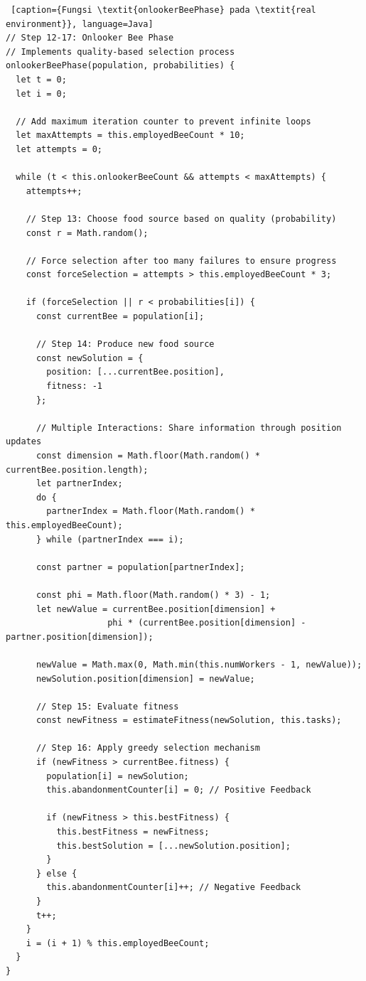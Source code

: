\begin{lstlisting} [caption={Fungsi \textit{onlookerBeePhase} pada \textit{real environment}}, language=Java]
// Step 12-17: Onlooker Bee Phase
// Implements quality-based selection process
onlookerBeePhase(population, probabilities) {
  let t = 0;
  let i = 0;
  
  // Add maximum iteration counter to prevent infinite loops
  let maxAttempts = this.employedBeeCount * 10;
  let attempts = 0;
  
  while (t < this.onlookerBeeCount && attempts < maxAttempts) {
    attempts++;
    
    // Step 13: Choose food source based on quality (probability)
    const r = Math.random();
    
    // Force selection after too many failures to ensure progress
    const forceSelection = attempts > this.employedBeeCount * 3;
    
    if (forceSelection || r < probabilities[i]) {
      const currentBee = population[i];
      
      // Step 14: Produce new food source
      const newSolution = {
        position: [...currentBee.position],
        fitness: -1
      };

      // Multiple Interactions: Share information through position updates
      const dimension = Math.floor(Math.random() * currentBee.position.length);
      let partnerIndex;
      do {
        partnerIndex = Math.floor(Math.random() * this.employedBeeCount);
      } while (partnerIndex === i);
      
      const partner = population[partnerIndex];
      
      const phi = Math.floor(Math.random() * 3) - 1;
      let newValue = currentBee.position[dimension] + 
                    phi * (currentBee.position[dimension] - partner.position[dimension]);
      
      newValue = Math.max(0, Math.min(this.numWorkers - 1, newValue));
      newSolution.position[dimension] = newValue;

      // Step 15: Evaluate fitness
      const newFitness = estimateFitness(newSolution, this.tasks);

      // Step 16: Apply greedy selection mechanism
      if (newFitness > currentBee.fitness) {
        population[i] = newSolution;
        this.abandonmentCounter[i] = 0; // Positive Feedback
        
        if (newFitness > this.bestFitness) {
          this.bestFitness = newFitness;
          this.bestSolution = [...newSolution.position];
        }
      } else {
        this.abandonmentCounter[i]++; // Negative Feedback
      }
      t++;
    }
    i = (i + 1) % this.employedBeeCount;
  }
}
\end{lstlisting}

